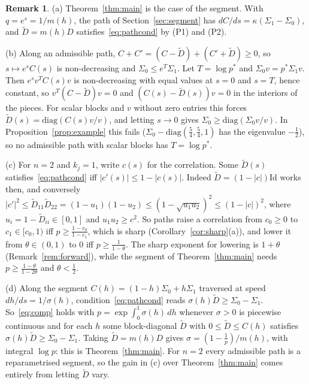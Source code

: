 \documentclass[11pt]{amsart}
\theoremstyle{definition}
\newtheorem{remark}[theorem]{Remark}
\newcommand{\Id}{\mathrm{Id}}
\begin{document}
\begin{remark}\label{rem:path}
(a) Theorem~\ref{thm:main} is the case of the segment. With $q=e^s=1/m(h)$, the path of Section~\ref{sec:segment} has
$dC/ds=\kappa(\Sigma_1-\Sigma_0)$, and $\tilde D=m(h)D$ satisfies~\eqref{eq:pathcond} by (P1) and (P2).

(b) Along an admissible path, $C+C'=(C-\tilde D)+(C'+\tilde D)\ge0$, so $s\mapsto e^sC(s)$ is non-decreasing and
$\Sigma_0\le e^T\Sigma_1$. Let $T=\log p^*$ and $\Sigma_0v=p^*\Sigma_1v$. Then $e^sv^TC(s)v$ is non-decreasing with
equal values at $s=0$ and $s=T$, hence constant, so $v^T(C-\tilde D)v=0$ and $(C(s)-\tilde D(s))v=0$ in the interiors
of the pieces. For scalar blocks and $v$ without zero entries this forces $\tilde D(s)=\mathrm{diag}(C(s)v/v)$, and
letting $s\to0$ gives $\Sigma_0\ge\mathrm{diag}(\Sigma_0v/v)$. In Proposition~\ref{prop:example} this fails
($\Sigma_0-\mathrm{diag}(\frac54,\frac54,1)$ has the eigenvalue $-\frac12$), so no admissible path with scalar blocks
has $T=\log p^*$.

(c) For $n=2$ and $k_j=1$, write $c(s)$ for the correlation. Some $\tilde D(s)$ satisfies~\eqref{eq:pathcond} iff
$|c'(s)|\le1-|c(s)|$. Indeed $\tilde D=(1-|c|)\Id$ works then, and conversely
$|c'|^2\le\tilde D_{11}\tilde D_{22}=(1-u_1)(1-u_2)\le(1-\sqrt{u_1u_2})^2\le(1-|c|)^2$, where
$u_i=1-\tilde D_{ii}\in[0,1]$ and $u_1u_2\ge c^2$. So paths raise a correlation from $c_0\ge0$ to $c_1\in[c_0,1)$ iff
$p\ge\frac{1-c_0}{1-c_1}$, which is sharp (Corollary~\ref{cor:sharp}(a)), and lower it from $\theta\in(0,1)$ to $0$
iff $p\ge\frac1{1-\theta}$. The sharp exponent for lowering is $1+\theta$ (Remark~\ref{rem:forward}), while the
segment of Theorem~\ref{thm:main} needs $p\ge\frac{1-\theta}{1-2\theta}$ and $\theta<\frac12$.

(d) Along the segment $C(h)=(1-h)\Sigma_0+h\Sigma_1$ traversed at speed $dh/ds=1/\sigma(h)$, condition~\eqref{eq:pathcond}
reads $\sigma(h)\tilde D\ge\Sigma_0-\Sigma_1$. So~\eqref{eq:comp} holds with $p=\exp\int_0^1\sigma(h)\,dh$ whenever $\sigma>0$
is piecewise continuous and for each $h$ some block-diagonal $\tilde D$ with $0\le\tilde D\le C(h)$ satisfies
$\sigma(h)\tilde D\ge\Sigma_0-\Sigma_1$. Taking $\tilde D=m(h)D$ gives $\sigma=(1-\frac1p)/m(h)$, with integral $\log p$:
this is Theorem~\ref{thm:main}. For $n=2$ every admissible path is a reparametrised segment, so the gain in (c) over
Theorem~\ref{thm:main} comes entirely from letting $\tilde D$ vary.
\end{remark}
\end{document}
